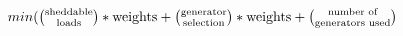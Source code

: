\documentclass[10pt,journal,letterpaper,compsoc, draftclsnofoot, onecolumn]{IEEEtran} %
\newcommand*{\bfrac}[2]{\genfrac{(}{)}{0pt}{}{#1}{#2}} %
\begin{document}


$min(\bfrac{\text{sheddable}}{\text{loads}} * \text{\small weights} +  \bfrac{\text{generator}}{\text{selection}} * \text{\small weights} +  \bfrac{\text{number of}}{\text{generators used}} $
\end{document}
